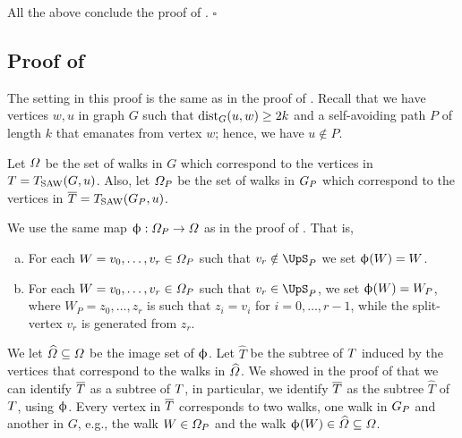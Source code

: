 \documentclass[11pt,reqno]{amsart}
\numberwithin{equation}{section}
\newcommand{\blue}[1]{{\color{blue}#1}}
\newcommand{\bluepigment}[1]{{\color{blue(pigment)}#1}}
\newcommand{\bostonuniversityred}[1]{{\color{bostonuniversityred}#1}}
\newcommand{\capri}[1]{{\color{capri}#1}}
\newcommand{\cadmiumgreen}[1]{{\color{cadmiumgreen}#1}}
\newcommand{\electricviolet}[1]{{\color{electricviolet}#1}}
\newcommand{\goldenbrown}[1]{{\color{goldenbrown}#1}}
\newcommand{\red}[1]{{\color{red}#1}}
\newcommand{\dist}{{\rm dist}}
\newcommand{\Tsaw}{T_{\rm SAW}}
\renewcommand{\blue}[1]{#1}
\renewcommand{\bluepigment}[1]{#1}
\renewcommand{\bostonuniversityred}[1]{#1}
\renewcommand{\capri}[1]{#1}
\renewcommand{\cadmiumgreen}[1]{#1}
\renewcommand{\electricviolet}[1]{#1}
\renewcommand{\goldenbrown}[1]{#1}
\renewcommand{\red}[1]{#1}
\newcommand{\ki}{\capri{i}}
\newcommand{\kk}{\bluepigment{k}}
\newcommand{\kP}{\goldenbrown{P}}
\newcommand{\kr}{\bostonuniversityred{r}}%
\newcommand{\ku}{\red{u}}
\newcommand{\kv}{\electricviolet{v}}
\newcommand{\kW}{\blue{W}}
\newcommand{\kw}{\blue{w}}
\newcommand{\kz}{\cadmiumgreen{z}}
\renewcommand{\ki}{i}
\renewcommand{\kk}{k}
\renewcommand{\kP}{P}
\renewcommand{\kr}{r}
\renewcommand{\ku}{u}
\renewcommand{\kv}{v}
\renewcommand{\kW}{W}
\renewcommand{\kw}{w}
\renewcommand{\kz}{z}
\begin{document}
All the above conclude the proof of .
\hfill $\square$



% 
\subsection{Proof of }\label{sec:lemma:BoundaryTVsBoundaryTPFromU}

The setting in this proof is the same as  in the proof of .   Recall that we have vertices
$\kw,\ku$ in graph $G$ such that $\dist_{G}(\ku,\kw)\geq 2\kk$ and a self-avoiding path $\kP$ of length $\kk$ that 
emanates from vertex $\kw$; hence,  we have $\ku\notin \kP$. 



Let $\Omega$ be the set of walks in  $G$ which correspond to the vertices in $\SMTu=\Tsaw(G,\ku)$.  Also, let 
$\sawpaths_{\kP}$ be the set of walks in $\gext{G}{\kP}$ which  correspond to the vertices in 
$\SMTPu=\Tsaw(\gext{G}{\kP},\ku)$. 




We use the same map $\BBijection:\sawpaths_{\kP}\to \sawpaths$ as in the proof of . 
That is, 
\begin{enumerate}[(a)]
\item For each $\kW=\kv_0, \ldots, \kv_{\kr}\in \sawpaths_{\kP}$ such that $\kv_{\kr}\notin \ssplit_{\kP}$
 we set $\BBijection(\kW)=\kW$. 
 \item For each $\kW=\kv_0, \ldots, \kv_{\kr}\in \sawpaths_{\kP}$ such that $\kv_{\kr}\in \ssplit_{\kP}$, we set
$\BBijection(\kW)=\kW_{\kP}$, where $\kW_{\kP}=\kz_0, \ldots, \kz_{\kr}$ is such that $\kz_{\ki}=\kv_{\ki}$ for $\ki=0, \ldots, \kr-1$,  
while the split-vertex $\kv_{\kr}$ is generated from $\kz_{\kr}$. 
\end{enumerate}
We let $\widehat{\Omega} \subseteq \Omega$ be the image set of  $\upphi$.  Let $\widehat{T}$ be the 
subtree  of $T$ induced by the vertices that correspond to the walks in $\widehat{\Omega}$.  We showed in 
the proof of  that we can identify $\SMTPu$ as a subtree of $T$,  in particular,  we identify 
$\SMTPu$ as the subtree $\widehat{T}$ of $T$,  using  $\upphi$.  Every vertex in $\SMTPu$ corresponds 
to two walks, one walk in $\gext{G}{\kP}$ and another  in $G$, e.g.,  the walk $\kW\in \sawpaths_{\kP}$ and the 
walk $\BBijection(\kW)\in \widehat{\sawpaths}\subseteq \sawpaths$.
\end{document}
